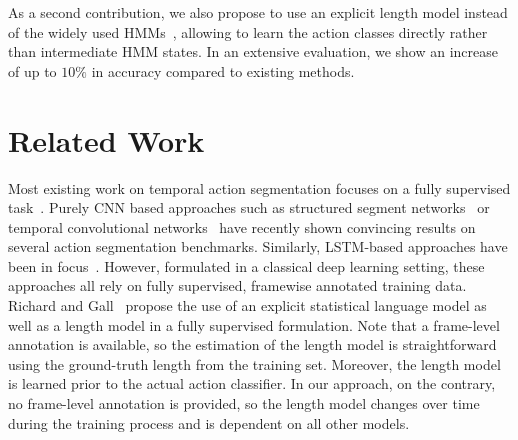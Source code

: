 \documentclass[10pt,twocolumn,letterpaper]{article}
\begin{document}
As a second contribution, we also propose to use an explicit length model instead of the widely used
HMMs~\cite{kuehne2017weakly,richard2017weakly,koller2016deephand,koller2017resign},
allowing to learn the action classes directly rather than intermediate HMM states.
In an extensive evaluation, we show an increase of up to $ 10\% $ in accuracy
compared to existing methods.


\section{Related Work}
\label{sec:related_work}

Most existing work on temporal action segmentation focuses on a fully supervised
task~\cite{kuehne16end,rohrbach2012database,tang2012learning,lea2016segmental,vo2014stochastic,ni2014multiple,eyjolfsdottir2014detecting,zhao2017segment,lea2017temporal,yeung2016endtoend,singh16multistream}.
Purely CNN based approaches such as structured segment networks~\cite{zhao2017segment}
or temporal convolutional networks~\cite{lea2017temporal} have recently shown
convincing results on several action segmentation benchmarks. Similarly, LSTM-based
approaches have been in focus~\cite{yeung2016endtoend,singh16multistream}. However,
formulated in a classical deep learning setting, these approaches all rely on fully
supervised, \ie framewise annotated training data.
Richard and Gall~\cite{richard2016temporal} propose
the use of an explicit statistical language model as well as a length model in a fully
supervised formulation.
Note that a frame-level annotation is available, so the estimation of the length model is straightforward
using the ground-truth length from the training set. Moreover, the length model is
learned prior to the actual action classifier. In our approach, on the contrary, no
frame-level annotation is provided, so the length model changes over time during the
training process and is dependent on all other models.
\end{document}
